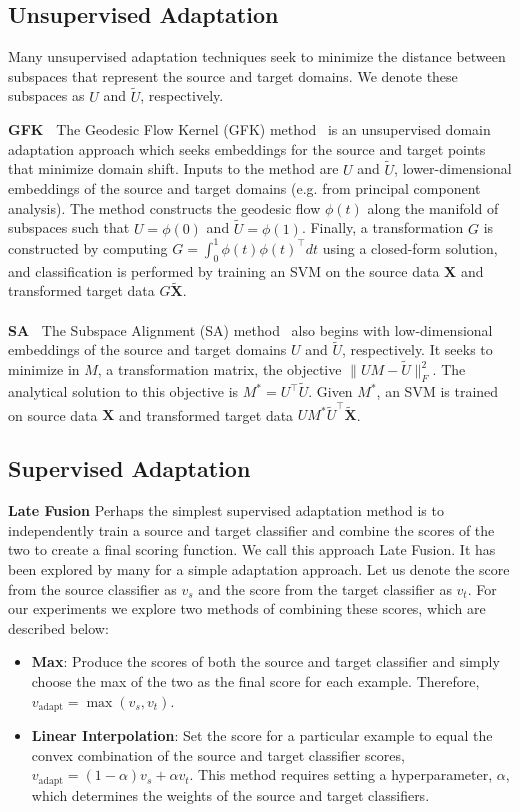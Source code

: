 \subsection{Unsupervised Adaptation}
Many unsupervised adaptation techniques seek to minimize the distance between subspaces that represent the source and target domains. We denote these subspaces as $U$ and $\tilde{U}$, respectively.

{\bf GFK~\cite{gong-cvpr12}}
The Geodesic Flow Kernel (GFK) method~\cite{gong-cvpr12} is an unsupervised domain adaptation approach which seeks embeddings for the source and target points that minimize domain shift.
Inputs to the method are $U$ and $\tilde{U}$, lower-dimensional embeddings of the source and target domains (e.g. from principal component analysis).
The method constructs the geodesic flow $\phi(t)$ along the manifold of subspaces such that $U = \phi(0)$ and $\tilde{U} = \phi(1)$.
Finally, a transformation $G$ is constructed by computing
$
G =
\int_0^1 \phi(t) \phi(t)^{\intercal} dt
$
using a closed-form solution, and classification is performed by training an SVM on the source data $\bm{X}$ and transformed target data $G\tilde{\bm{X}}$.
\\\\
{\bf SA~\cite{sa}}
The Subspace Alignment (SA) method~\cite{sa} also begins with low-dimensional embeddings of the source and target domains $U$ and $\tilde{U}$, respectively.
It seeks to minimize in $M$, a transformation matrix, the objective
$ \| UM - \tilde{U} \|^2_F$.
The analytical solution to this objective is $M^* = U^{\intercal} \tilde{U}$.
Given $M^*$, an SVM is trained on source data $\bm{X}$ and transformed target data $U M^* \tilde{U}^{\intercal} \tilde{\bm{X}}$.


\subsection{Supervised Adaptation}

{\bf Late Fusion}
Perhaps the simplest supervised adaptation method is to independently train a source and target classifier and combine the scores of the two to create a final scoring function. 
We call this approach Late Fusion. It has been explored by many for a simple adaptation approach.
Let us denote the score from the source classifier as $v_s$ and the score from the target classifier as $v_t$.  For our experiments we explore two methods of combining these scores, which are described below:
\begin{itemize}
\item {\bf Max}: Produce the scores of both the source and target classifier and simply choose the max of the two as the final score for each example. Therefore, $v_{\text{adapt}} = \max(v_s, v_t)$.
\item {\bf Linear Interpolation}: Set the score for a particular example to equal the convex combination of the source and target classifier scores,  $v_{\text{adapt}} = (1-\alpha)v_{s} + \alpha v_{t}$. This method requires setting a hyperparameter, $\alpha$, which determines the weights of the source and target classifiers.
\end{itemize}

